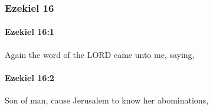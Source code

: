 	\subsubsection{Ezekiel 16} %
		\label{EZEKIEL-16}

		\paragraph{Ezekiel 16:1} %
			\label{EZEKIEL-16-1}

			Again the word of the LORD came unto me, saying,


		\paragraph{Ezekiel 16:2} %
			\label{EZEKIEL-16-2}

			Son of man, cause Jerusalem to know her abominations,


